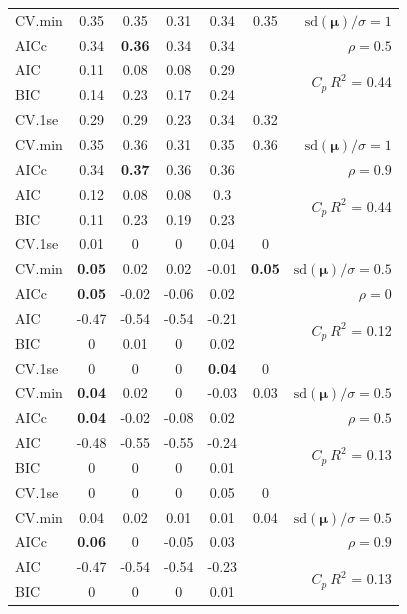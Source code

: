 \documentclass[12pt]{article}
\newcommand{\mr}[1]{\mathrm{#1}}
\newcommand{\bm}[1]{\mathbf{#1}}
\begin{document}
\begin{table}[p]
\begin{center}
\begin{tabular}{l*{5}{c}|r}
CV.min & 0.35 & 0.35 & 0.31 & 0.34 & 0.35 &  $\mr{sd}(\bm{\mu})/\sigma=1$ \\
AICc & 0.34 & {\bf 0.36} & 0.34 & 0.34 & & $\rho=0.5$ \\
AIC & 0.11 & 0.08 & 0.08 & 0.29 & & \multirow{2}{*}{$C_p ~ R^2$ = 0.44} \\
BIC & 0.14 & 0.23 & 0.17 & 0.24 & & \\
 \hline 
CV.1se & 0.29 & 0.29 & 0.23 & 0.34 & 0.32 &\\
CV.min & 0.35 & 0.36 & 0.31 & 0.35 & 0.36 &  $\mr{sd}(\bm{\mu})/\sigma=1$ \\
AICc & 0.34 & {\bf 0.37} & 0.36 & 0.36 & & $\rho=0.9$ \\
AIC & 0.12 & 0.08 & 0.08 & 0.3 & & \multirow{2}{*}{$C_p ~ R^2$ = 0.44} \\
BIC & 0.11 & 0.23 & 0.19 & 0.23 & & \\
 \hline 
CV.1se & 0.01 & 0 & 0 & 0.04 & 0 &\\
CV.min & {\bf 0.05} & 0.02 & 0.02 & -0.01 & {\bf 0.05} &  $\mr{sd}(\bm{\mu})/\sigma=0.5$ \\
AICc & {\bf 0.05} & -0.02 & -0.06 & 0.02 & & $\rho=0$ \\
AIC & -0.47 & -0.54 & -0.54 & -0.21 & & \multirow{2}{*}{$C_p ~ R^2$ = 0.12} \\
BIC & 0 & 0.01 & 0 & 0.02 & & \\
 \hline 
CV.1se & 0 & 0 & 0 & {\bf 0.04} & 0 &\\
CV.min & {\bf 0.04} & 0.02 & 0 & -0.03 & 0.03 &  $\mr{sd}(\bm{\mu})/\sigma=0.5$ \\
AICc & {\bf 0.04} & -0.02 & -0.08 & 0.02 & & $\rho=0.5$ \\
AIC & -0.48 & -0.55 & -0.55 & -0.24 & & \multirow{2}{*}{$C_p ~ R^2$ = 0.13} \\
BIC & 0 & 0 & 0 & 0.01 & & \\
 \hline 
CV.1se & 0 & 0 & 0 & 0.05 & 0 &\\
CV.min & 0.04 & 0.02 & 0.01 & 0.01 & 0.04 &  $\mr{sd}(\bm{\mu})/\sigma=0.5$ \\
AICc & {\bf 0.06} & 0 & -0.05 & 0.03 & & $\rho=0.9$ \\
AIC & -0.47 & -0.54 & -0.54 & -0.23 & & \multirow{2}{*}{$C_p ~ R^2$ = 0.13} \\
BIC & 0 & 0 & 0 & 0.01 & & \\
 \hline 
\end{tabular}
\end{center}
\vspace{-1cm}
\end{table}
\end{document}
